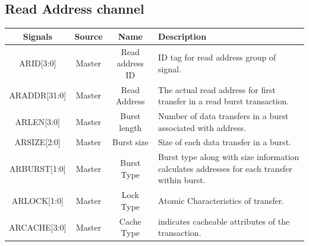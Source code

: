 \documentclass{article}
\begin{document}
\subsection{Read Address channel}
\begin{table}[H]
    \begin{center}
        \begin{tabular}{c|c|c|p{9.5cm}}
            \textbf{Signals} & \textbf{Source} & \textbf{Name}      & \textbf{Description}                                                                                                                                                              \\
            \hline
            ARID[3:0]        & Master          & Read address ID    & ID tag for read address group of signal.                                                                                                                                          \\
            ARADDR[31:0]     & Master          & Read Address       & The actual read address for first transfer in a read burst transaction.                                                                                                           \\
            ARLEN[3:0]       & Master          & Burst length       & Number of data transfers in a burst associated with address.                                                                                                                      \\
            ARSIZE[2:0]      & Master          & Burst size         & Size of each data transfer in a burst.                                                                                                                                            \\
            ARBURST[1:0]     & Master          & Burst Type         & Burst type along with size information calculates addresses for each transfer within burst.                                                                                       \\
            ARLOCK[1:0]      & Master          & Lock Type          & Atomic Characteristics of transfer.                                                                                                                                               \\
            ARCACHE[3:0]     & Master          & Cache Type         & indicates cacheable attributes of the transaction.                                                                                                                                \\

\end{tabular}
\end{center}
\end{table}
\end{document}
